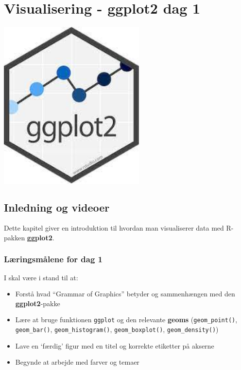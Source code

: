 \documentclass[
]{book}
\providecommand{\tightlist}{%
  \setlength{\itemsep}{0pt}\setlength{\parskip}{0pt}}
\begin{document}
\hypertarget{visual1}{%
\chapter{Visualisering - ggplot2 dag 1}\label{visual1}}

\includegraphics[width=2.9in]{plots/ggplot2_logo}

\hypertarget{inledning-og-videoer}{%
\section{Inledning og videoer}\label{inledning-og-videoer}}

Dette kapitel giver en introduktion til hvordan man visualiserer data med R-pakken \textbf{ggplot2}.

\hypertarget{luxe6ringsmuxe5lene-for-dag-1}{%
\subsection{Læringsmålene for dag 1}\label{luxe6ringsmuxe5lene-for-dag-1}}

I skal være i stand til at:

\begin{itemize}
\tightlist
\item
  Forstå hvad ``Grammar of Graphics'' betyder og sammenhængen med den \textbf{ggplot2}-pakke
\item
  Lære at bruge funktionen \texttt{ggplot} og den relevante \textbf{geoms} (\texttt{geom\_point()}, \texttt{geom\_bar()}, \texttt{geom\_histogram()}, \texttt{geom\_boxplot()}, \texttt{geom\_density()})
\item
  Lave en `færdig' figur med en titel og korrekte etiketter på akserne
\item
  Begynde at arbejde med farver og temaer
\end{itemize}
\end{document}

